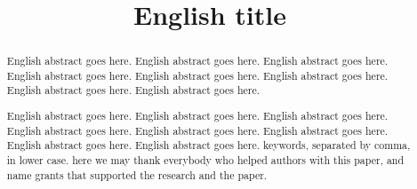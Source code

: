 \documentclass[intlimits,twoside,a4paper,11pt]{article}
\begin{document}

\begin{translatedpart}
\title{English title}



\maketranslatedtitle

\begin{abstract}
English abstract goes here. English abstract goes here. English abstract goes here. English abstract goes here.
English abstract goes here. English abstract goes here. English abstract goes here. English abstract goes here.

English abstract goes here. English abstract goes here. English abstract goes here. English abstract goes here.
English abstract goes here. English abstract goes here. English abstract goes here. English abstract goes here.
\keywords keywords, separated by comma, in lower case.
\autocitationexample
\acknowledgements here we may thank everybody who helped authors with this paper, and name grants that supported the research and the paper.
\end{abstract}


\end{translatedpart}

\end{document}
